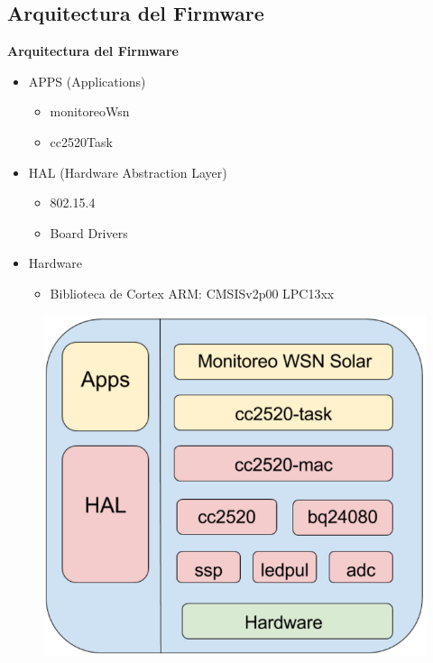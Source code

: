 \documentclass[aspectratio=43, handout]{beamer}
\begin{document}
\subsection[Arquitectura]{Arquitectura del Firmware}
\begin{frame}{\textbf{\LARGE{Arquitectura del Firmware}}}
\fontsize{14pt}{14}\selectfont
\begin{minipage}[c]{1.0\linewidth}
	\begin{minipage}[c]{0.4\linewidth}
		\begin{itemize}
			\item APPS (Applications)
			\begin{itemize}
			\item monitoreoWsn			
			\item cc2520Task
			\vspace{10px}
			\end{itemize}
			\item HAL (Hardware Abstraction Layer)
			\begin{itemize}
			\item 802.15.4			
			\item Board Drivers
			\vspace{10px}
			\end{itemize}						
			\item Hardware
			\begin{itemize}
			\item Biblioteca de Cortex ARM: CMSISv2p00 LPC13xx
			\end{itemize}
		\end{itemize}	
	  \end{minipage}
	  \begin{minipage}[c]{0.4\linewidth}
		\begin{figure}[H]
			{\includegraphics[width=1.5\textwidth]{./imagenes/arqcolor.PNG}}
		\end{figure}	  	  	
	  \end{minipage}
\end{minipage}


\end{frame}
\end{document}
